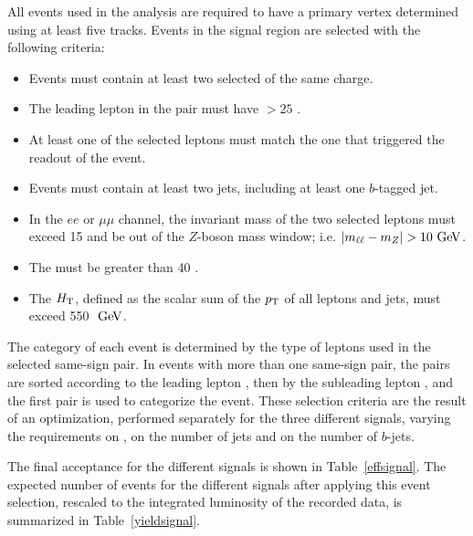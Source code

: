 All events used in the analysis are required to have a primary vertex determined using at least five tracks.
Events in the signal region are selected with the following criteria:
\begin{itemize}
\item Events must contain at least two selected of the same charge. 
\item The leading lepton in the pair must have \pT $>25$ \GeV{}.
\item At least one of the selected leptons must match the one that triggered the readout of the event.
\item Events must contain at least two jets, including at least one $b$-tagged jet.
\item In the $ee$ or $\mu\mu$ channel, the invariant mass of the two selected leptons must exceed 15 \GeV{} and be out of the $Z$-boson mass window; i.e. $|m_{\ell\ell} - m_Z| > 10 \GeV$.
\item The \met{} must be greater than 40 \GeV{}.
\item The $H_{\mathrm{T}}{}$, defined as the scalar sum of the $p_{\mathrm{T}}$ of all leptons and jets, must exceed 550 $\GeV{}$.
\end{itemize}
The category of each event is determined by the type of leptons used in the selected same-sign pair.
In events with more than one same-sign pair, the pairs are sorted according to the leading lepton \pT, then by the subleading lepton \pT, and the first pair is used to categorize the event.
These selection criteria are the result of an optimization, performed separately for the three different signals, varying the requirements on \HT{}, on the number of jets and on the number of $b$-jets.

The final acceptance for the different signals is shown in Table~\ref{effsignal}.
The expected number of events for the different signals after applying this event selection, rescaled to the integrated luminosity of the recorded data, is summarized in Table~\ref{yieldsignal}.

